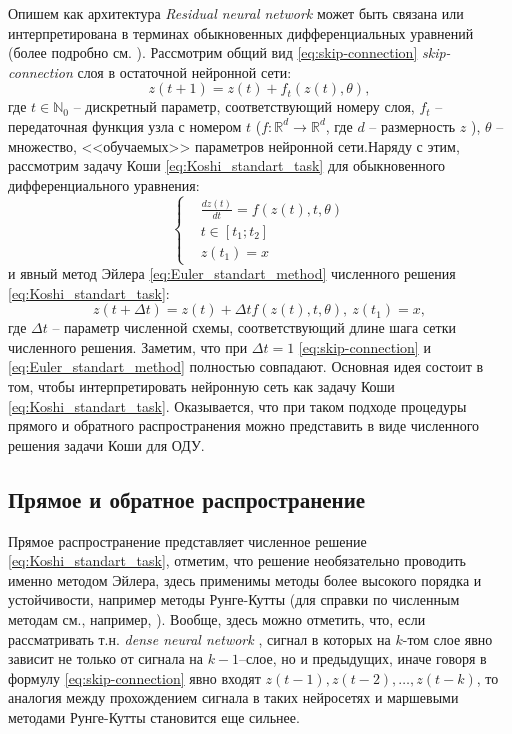 \documentclass[]{scrartcl}
\newcommand{\tit}[1]{%
\textit{#1}%
}
\begin{document}
Опишем как архитектура \tit{Residual neural network} может быть связана или интерпретирована в терминах обыкновенных дифференциальных уравнений (более подробно см. \cite{NeuralODE, OptNet_diff_opt, arbitr_deep_ResNN} ). Рассмотрим общий вид \eqref{eq:skip-connection} \tit{skip-connection} слоя в остаточной нейронной сети:
\begin{equation} \label{eq:skip-connection}
z(t+1) = z(t) + f_t (z (t), \theta ),
\end{equation}
где $t \in \mathbb{N}_0$ -- дискретный параметр, соответствующий номеру слоя, $f_t$ -- передаточная функция узла с номером $t$ ($f: \mathbb{R}^d \to \mathbb{R}^d$, где $d$ -- размерность $z$ ), $\theta$ -- множество, <<обучаемых>> параметров нейронной сети.Наряду с этим, рассмотрим задачу Коши \eqref{eq:Koshi_standart_task} для обыкновенного дифференциального уравнения:
\begin{equation} \label{eq:Koshi_standart_task}
\left\{ \begin{aligned}
			& \frac{d z(t) }{dt} = f(z(t), t, \theta) \\
			& t \in [t_1 ; t_2] \\
			& z(t_1) = x
		\end{aligned} \right.
\end{equation}
и явный метод Эйлера \eqref{eq:Euler_standart_method} численного решения \eqref{eq:Koshi_standart_task}:
\begin{equation} \label{eq:Euler_standart_method}
z(t+\Delta t) = z(t) + \Delta t f(z(t), t, \theta), ~ z(t_1) = x,
\end{equation}
где $\Delta t$ -- параметр численной схемы, соответствующий длине шага сетки численного решения. Заметим, что при $\Delta t = 1$ \eqref{eq:skip-connection} и \eqref{eq:Euler_standart_method} полностью совпадают.
Основная идея состоит в том, чтобы интерпретировать нейронную сеть как задачу Коши \eqref{eq:Koshi_standart_task}. Оказывается, что при таком подходе процедуры прямого и обратного распространения можно представить в виде численного решения задачи Коши для ОДУ.
 
\subsection{Прямое и обратное распространение}
Прямое распространение представляет численное решение \eqref{eq:Koshi_standart_task}, отметим, что решение необязательно проводить именно методом Эйлера, здесь применимы методы более высокого порядка и устойчивости, например методы Рунге-Кутты (для справки по численным методам  см., например, \cite{RK_method}). Вообще, здесь можно отметить, что, если рассматривать т.н. \tit{dense neural network}, сигнал в которых на $k$-том слое явно зависит не только от сигнала на $k-1$--слое, но и предыдущих, иначе говоря в формулу \eqref{eq:skip-connection} явно входят   $z(t-1), z(t-2), \dots , z(t-k) $, то аналогия между прохождением сигнала в таких нейросетях и маршевыми методами Рунге-Кутты становится еще сильнее. 
\end{document}
